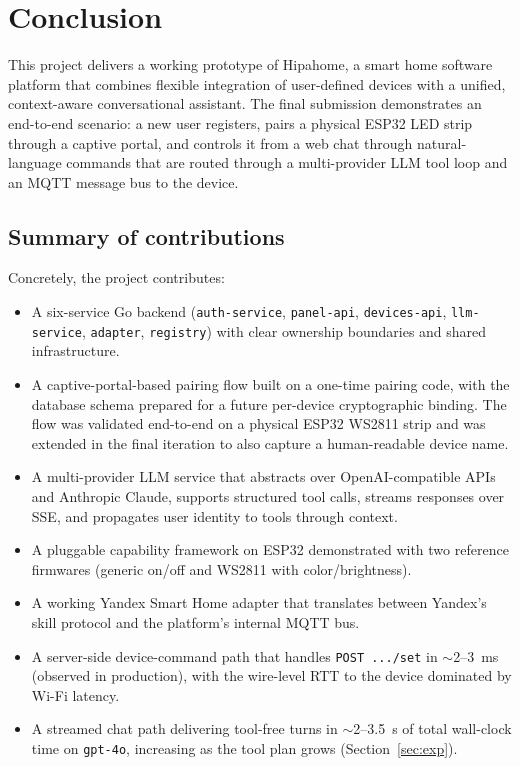 \documentclass[a4paper,12pt]{article}
\begin{document}
\newpage

\section{Conclusion}
\label{sec:conclusion}

This project delivers a working prototype of Hipahome, a smart home software platform that combines flexible integration of user-defined devices with a unified, context-aware conversational assistant. The final submission demonstrates an end-to-end scenario: a new user registers, pairs a physical ESP32 LED strip through a captive portal, and controls it from a web chat through natural-language commands that are routed through a multi-provider LLM tool loop and an MQTT message bus to the device.

\subsection{Summary of contributions}

Concretely, the project contributes:

\begin{itemize}
  \item A six-service Go backend (\verb|auth-service|, \verb|panel-api|, \verb|devices-api|, \verb|llm-service|, \verb|adapter|, \verb|registry|) with clear ownership boundaries and shared infrastructure.
  \item A captive-portal-based pairing flow built on a one-time pairing code, with the database schema prepared for a future per-device cryptographic binding. The flow was validated end-to-end on a physical ESP32 WS2811 strip and was extended in the final iteration to also capture a human-readable device name.
  \item A multi-provider LLM service that abstracts over OpenAI-compatible APIs and Anthropic Claude, supports structured tool calls, streams responses over SSE, and propagates user identity to tools through context.
  \item A pluggable capability framework on ESP32 demonstrated with two reference firmwares (generic on/off and WS2811 with color/brightness).
  \item A working Yandex Smart Home adapter that translates between Yandex's skill protocol and the platform's internal MQTT bus.
  \item A server-side device-command path that handles \verb|POST .../set| in $\sim$2--3~ms (observed in production), with the wire-level RTT to the device dominated by Wi-Fi latency.
  \item A streamed chat path delivering tool-free turns in $\sim$2--3.5~s of total wall-clock time on \verb|gpt-4o|, increasing as the tool plan grows (Section~\ref{sec:exp}).
\end{itemize}
\end{document}
